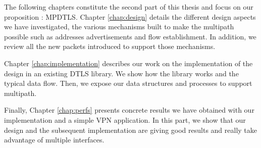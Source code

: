 The following chapters constitute the second part of this thesis and focus on our proposition : MPDTLS. Chapter \ref{chap:design} details the different design aspects we have investigated, the various mechanisms built to make the multipath possible such as addresses advertisements and flow establishment. In addition, we review all the new packets introduced to support those mechanisms.

Chapter \ref{chap:implementation} describes our work on the implementation of the design in an existing DTLS library. We show how the library works and the typical data flow. Then, we expose our data structures and processes to support multipath.

Finally, Chapter \ref{chap:perfs} presents concrete results we have obtained with our implementation and a simple VPN application. In this part, we show that our design and the subsequent implementation are giving good results and really take advantage of multiple interfaces.

